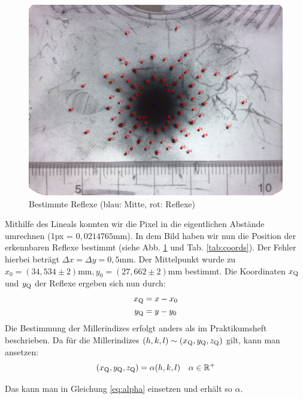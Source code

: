 \begin{figure}[h]
\centering
\includegraphics[scale=0.6]{data/laue/draw/laue_before.png}
\caption{Bestimmte Reflexe (blau: Mitte, rot: Reflexe)}
\label{fig:laue_points}
\end{figure}

Mithilfe des Lineals konnten wir die Pixel in die eigentlichen Abstände umrechnen (1px = $0,0214765\si{\milli\meter}$). In dem Bild haben wir nun die Position der erkennbaren Reflexe bestimmt (siehe Abb. \ref{fig:laue_points} und Tab. \ref{tab:coords}). Der Fehler hierbei beträgt $\Delta x=\Delta y = 0,5 \si{\milli\meter}$. Der Mittelpunkt wurde zu $x_0 = (34,534 \pm 2)\si{\milli\meter}, y_0 = (27,662 \pm 2)\si{\milli\meter}$ bestimmt. Die Koordinaten $x_\mathrm{Q}$ und $y_\mathrm{Q}$ der Reflexe ergeben sich nun durch:
\begin{align*}
x_\mathrm{Q} &= x - x_0\\
y_\mathrm{Q} &= y - y_0
\end{align*}
Die Bestimmung der Millerindizes erfolgt anders als im Praktikumsheft beschrieben.
Da für die Millerindizes $(h,k,l) \sim (x_\mathrm{Q},y_\mathrm{Q},z_\mathrm{Q})$ gilt, kann man ansetzen:
\begin{align*}
(x_\mathrm{Q},y_\mathrm{Q},z_\mathrm{Q}) &= \alpha (h,k,l) & \alpha \in \mathbb{R}^+\\
\end{align*}

Das kann man in Gleichung \ref{eq:alpha} einsetzen und erhält so $\alpha$.

